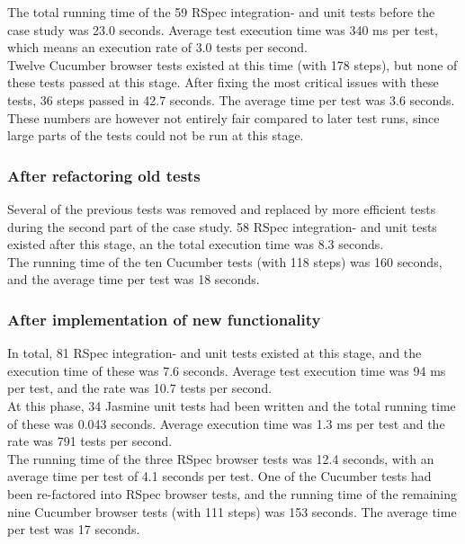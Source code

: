 The total running time of the 59 RSpec integration- and unit tests
before the case study was 23.0 seconds. Average test execution time was
340 ms per test, which means an execution rate of 3.0 tests per
second.\\

Twelve Cucumber browser tests existed at this time (with 178 steps), but
none of these tests passed at this stage. After fixing the most critical
issues with these tests, 36 steps passed in 42.7 seconds. The average
time per test was 3.6 seconds. These numbers are however not entirely
fair compared to later test runs, since large parts of the tests could
not be run at this stage.\\


\subsubsection{After refactoring old tests}

Several of the previous tests was removed and replaced by more efficient
tests during the second part of the case study. 58 RSpec integration-
and unit tests existed after this stage, an the total execution time was
8.3 seconds.\\

The running time of the ten Cucumber tests (with 118 steps) was 160
seconds, and the average time per test was 18 seconds.\\


\subsubsection{After implementation of new functionality}

In total, 81 RSpec integration- and unit tests existed at this stage,
and the execution time of these was 7.6 seconds. Average test execution
time was 94 ms per test, and the rate was 10.7 tests per
second.\\

At this phase, 34 Jasmine unit tests had been written and the total
running time of these was 0.043 seconds. Average execution time was 1.3
ms per test and the rate was 791 tests per second.\\

The running time of the three RSpec browser tests was 12.4 seconds, with
an average time per test of 4.1 seconds per test. One of the Cucumber
tests had been re-factored into RSpec browser tests, and the running
time of the remaining nine Cucumber browser tests (with 111 steps) was
153 seconds. The average time per test was 17 seconds.\\
